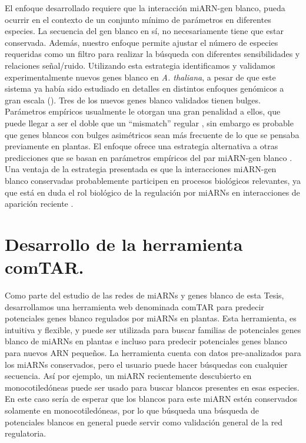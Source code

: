 El enfoque desarrollado requiere que la interacción miARN-gen blanco, pueda ocurrir en el contexto de un conjunto mínimo de parámetros en diferentes especies.
La secuencia del gen blanco en sí, no necesariamente tiene que estar conservada.
Además, nuestro enfoque permite ajustar el número de especies requeridas como un filtro para realizar la búsqueda con diferentes sensibilidades y relaciones señal/ruido.
Utilizando esta estrategia identificamos y validamos experimentalmente nuevos genes blanco en \textit{A. thaliana}, a pesar de que este sistema ya había sido estudiado en detalles en distintos enfoques genómicos a gran escala (\citep{Allen2005207,JonesRhoades2004787,Addo-quaye2009a,German2008,Rajagopalan2006,Schwab2005517}).
Tres de los nuevos genes blanco validados tienen bulges. Parámetros empíricos usualmente le otorgan una gran penalidad a ellos, que puede llegar a ser el doble que un ``mismatch'' regular \citep{JonesRhoades2004787},  sin embargo es probable que genes blancos con bulges asimétricos sean más frecuente de lo que se pensaba previamente en plantas.
El enfoque ofrece una estrategia alternativa a otras predicciones que se basan en parámetros empíricos del par miARN-gen blanco \citep{Allen2005207,JonesRhoades2004787,citeulike:8816489,Fahlgren_chapter}.
Una ventaja de la estrategia presentada es que la interacciones miARN-gen blanco conservadas probablemente participen en procesos biológicos relevantes, ya que está en duda el rol biológico de la regulación por miARNs en interacciones de aparición reciente \citep{Axtell2008343,citeulike:8816489}.

\section{Desarrollo de la herramienta comTAR.}

Como parte del estudio de las redes de miARNs y genes blanco de esta Tesis, desarrollamos una herramienta web denominada comTAR para predecir potenciales genes blanco regulados por miARNs en plantas. 
Esta herramienta, es intuitiva y flexible, y puede ser utilizada para buscar familias de potenciales genes blanco de miARNs en plantas e incluso para predecir potenciales genes blanco para nuevos ARN pequeños.
La herramienta cuenta con datos pre-analizados para los miARNs conservados, pero el usuario puede hacer búsquedas con cualquier secuencia.
Así por ejemplo, un miARN recientemente descubierto en monocotiledóneas puede ser usado para buscar blancos presentes en esas especies.
En este caso sería de esperar que los blancos para este miARN estén conservados solamente en monocotiledóneas, por lo que búsqueda una búsqueda de potenciales blancos en general puede servir como validación general de la red regulatoria.

